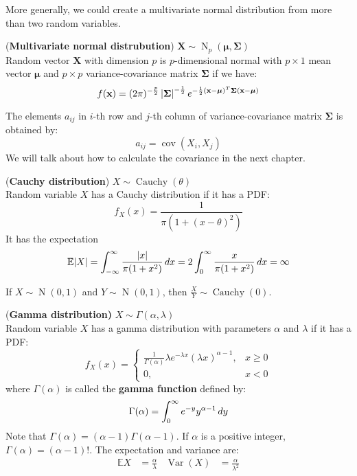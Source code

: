 \documentclass{huhtakm-template-book}
\newcommand{\expect}{\mathbb{E}}
\DeclareMathOperator{\N}{N}
\DeclareMathOperator{\Cauchy}{Cauchy}
\DeclareMathOperator{\Var}{Var}
\DeclareMathOperator{\cov}{cov}
\begin{document}
\newpage
More generally, we could create a multivariate normal distribution from more than two random variables.
\begin{eg}(\textbf{Multivariate normal distrubution}) $\mathbf{X}\sim\N_{p}(\boldsymbol{\mu},\mathbf{\Sigma})$\\
	Random vector $\mathbf{X}$ with dimension $p$ is $p$-dimensional normal with $p\times 1$ mean vector $\boldsymbol{\mu}$ and $p\times p$ variance-covariance matrix $\mathbf{\Sigma}$ if we have:
	\begin{equation*}
		f(\mathbf{x})=(2\pi)^{-\frac{p}{2}}\left|{\mathbf{\Sigma}}\right|^{-\frac{1}{2}}e^{-\frac{1}{2}(\mathbf{x}-\boldsymbol{\mu})^{T}\mathbf{\Sigma}(\mathbf{x}-\boldsymbol{\mu})}
	\end{equation*}
\end{eg}
\begin{rem}
	The elements $a_{ij}$ in $i$-th row and $j$-th column of variance-covariance matrix $\mathbf{\Sigma}$ is obtained by:
	\begin{equation*}
		a_{ij}=\cov(X_{i},X_{j})
	\end{equation*} 
	We will talk about how to calculate the covariance in the next chapter.
\end{rem}
\begin{eg}(\textbf{Cauchy distribution}) $X\sim\Cauchy(\theta)$\\
	Random variable $X$ has a Cauchy distribution if it has a PDF:
	\begin{equation*}
		f_{X}(x)=\frac{1}{\pi(1+(x-\theta)^{2})}
	\end{equation*}
	It has the expectation
	\begin{equation*}
		\expect|X|=\intinfty\frac{|x|}{\pi(1+x^{2})}\,dx=2\intlu{0}{\infty}\frac{x}{\pi(1+x^{2})}\,dx=\infty
	\end{equation*}
\end{eg}
\begin{rem}
	If $X\sim\N(0,1)$ and $Y\sim\N(0,1)$, then $\frac{X}{Y}\sim\Cauchy(0)$.
\end{rem}
\begin{eg}(\textbf{Gamma distribution)} $X\sim\Gamma(\alpha,\lambda)$\\
	Random variable $X$ has a gamma distribution with parameters $\alpha$ and $\lambda$ if it has a PDF:
	\begin{equation*}
		f_{X}(x)=\begin{cases}
			\frac{1}{\Gamma(\alpha)}\lambda e^{-\lambda x}(\lambda x)^{\alpha-1}, &x\geq 0\\
			0, &x<0
		\end{cases}
	\end{equation*}
	where $\Gamma(\alpha)$ is called the \textbf{gamma function} defined by:
	\begin{equation*}
		\Gamma(\alpha)=\int_{0}^{\infty}e^{-y}y^{\alpha-1}\,dy
	\end{equation*}
	Note that $\Gamma(\alpha)=(\alpha-1)\Gamma(\alpha-1)$. If $\alpha$ is a positive integer, $\Gamma(\alpha)=(\alpha-1)!$. The expectation and variance are:
	\begin{align*}
		\expect{X}&=\frac{\alpha}{\lambda} & \Var(X)&=\frac{\alpha}{\lambda^{2}}
	\end{align*}
\end{eg}
\end{document}
